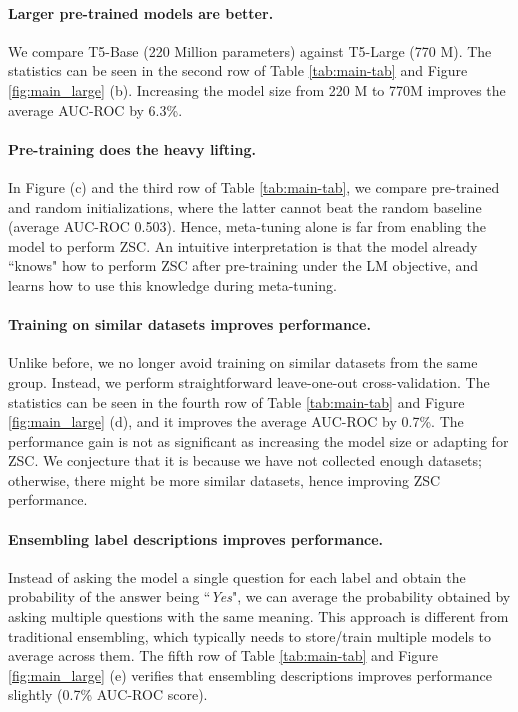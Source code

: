 \paragraph{Larger pre-trained models are better.} We compare T5-Base (220 Million parameters) against T5-Large (770 M). The statistics can be seen in the second row of Table \ref{tab:main-tab} and Figure \ref{fig:main_large} (b). Increasing the model size from 220 M to 770M improves the average AUC-ROC by 6.3\%. 

\paragraph{Pre-training does the heavy lifting.} In Figure (c) and the third row of Table \ref{tab:main-tab}, we compare pre-trained and random initializations, where the latter cannot beat the random baseline (average AUC-ROC 0.503). Hence, meta-tuning alone is far from enabling the model to perform ZSC. An intuitive interpretation is that the model already ``knows" how to perform ZSC after pre-training under the LM objective, and learns how to use this knowledge during meta-tuning.

\paragraph{Training on similar datasets improves performance.} Unlike before, we no longer avoid training on similar datasets from the same group. Instead, we perform straightforward leave-one-out cross-validation. The statistics can be seen in the fourth row of Table \ref{tab:main-tab} and Figure \ref{fig:main_large} (d), and it improves the average AUC-ROC by 0.7\%.
The performance gain is not as significant as increasing the model size or adapting for ZSC. We conjecture that it is because we have not collected enough datasets; otherwise, there might be more similar datasets, hence improving ZSC performance.

\paragraph{Ensembling label descriptions improves performance.} Instead of asking the model a single question for each label and obtain the probability of the answer being ``\textit{Yes}", we can average the probability obtained by asking multiple questions with the same meaning. This approach is different from traditional ensembling, which typically needs to store/train multiple models to average across them. The fifth row of Table \ref{tab:main-tab} and Figure \ref{fig:main_large} (e) verifies that ensembling descriptions improves performance slightly (0.7\% AUC-ROC score).

